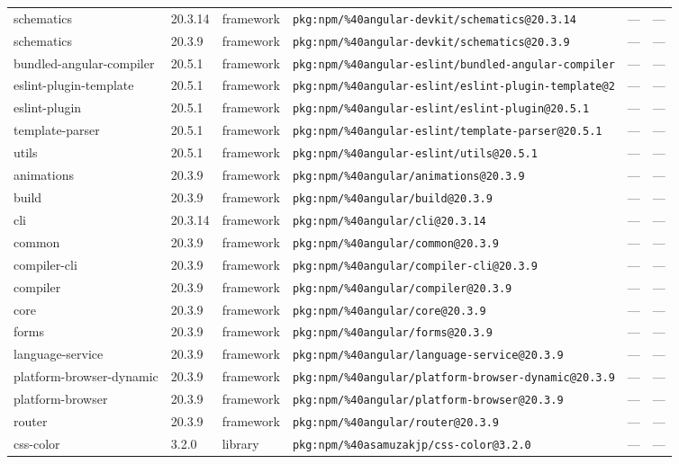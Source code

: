 \documentclass[11pt]{article}
\begin{document}
\begin{longtable}{|l|l|l|p{2.2cm}|l|p{4cm}|}
schematics & 20.3.14 & framework & \texttt{pkg:npm/\%40angular-devkit/schematics@20.3.14} & — & — \\
schematics & 20.3.9 & framework & \texttt{pkg:npm/\%40angular-devkit/schematics@20.3.9} & — & — \\
bundled-angular-compiler & 20.5.1 & framework & \texttt{pkg:npm/\%40angular-eslint/bundled-angular-compiler} & — & — \\
eslint-plugin-template & 20.5.1 & framework & \texttt{pkg:npm/\%40angular-eslint/eslint-plugin-template@2} & — & — \\
eslint-plugin & 20.5.1 & framework & \texttt{pkg:npm/\%40angular-eslint/eslint-plugin@20.5.1} & — & — \\
template-parser & 20.5.1 & framework & \texttt{pkg:npm/\%40angular-eslint/template-parser@20.5.1} & — & — \\
utils & 20.5.1 & framework & \texttt{pkg:npm/\%40angular-eslint/utils@20.5.1} & — & — \\
animations & 20.3.9 & framework & \texttt{pkg:npm/\%40angular/animations@20.3.9} & — & — \\
build & 20.3.9 & framework & \texttt{pkg:npm/\%40angular/build@20.3.9} & — & — \\
cli & 20.3.14 & framework & \texttt{pkg:npm/\%40angular/cli@20.3.14} & — & — \\
common & 20.3.9 & framework & \texttt{pkg:npm/\%40angular/common@20.3.9} & — & — \\
compiler-cli & 20.3.9 & framework & \texttt{pkg:npm/\%40angular/compiler-cli@20.3.9} & — & — \\
compiler & 20.3.9 & framework & \texttt{pkg:npm/\%40angular/compiler@20.3.9} & — & — \\
core & 20.3.9 & framework & \texttt{pkg:npm/\%40angular/core@20.3.9} & — & — \\
forms & 20.3.9 & framework & \texttt{pkg:npm/\%40angular/forms@20.3.9} & — & — \\
language-service & 20.3.9 & framework & \texttt{pkg:npm/\%40angular/language-service@20.3.9} & — & — \\
platform-browser-dynamic & 20.3.9 & framework & \texttt{pkg:npm/\%40angular/platform-browser-dynamic@20.3.9} & — & — \\
platform-browser & 20.3.9 & framework & \texttt{pkg:npm/\%40angular/platform-browser@20.3.9} & — & — \\
router & 20.3.9 & framework & \texttt{pkg:npm/\%40angular/router@20.3.9} & — & — \\
css-color & 3.2.0 & library & \texttt{pkg:npm/\%40asamuzakjp/css-color@3.2.0} & — & — \\

\end{longtable}
\end{document}
